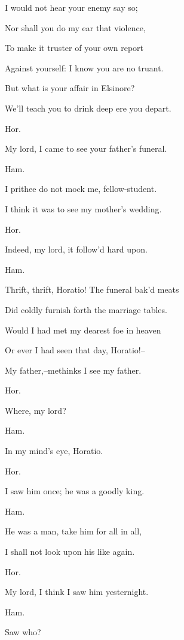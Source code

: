 \documentclass[12pt]{book}
\begin{document}
I would not hear your enemy say so;

Nor shall you do my ear that violence,

To make it truster of your own report

Against yourself: I know you are no truant.

But what is your affair in Elsinore?

We'll teach you to drink deep ere you depart.



Hor.

My lord, I came to see your father's funeral.



Ham.

I prithee do not mock me, fellow-student.

I think it was to see my mother's wedding.



Hor.

Indeed, my lord, it follow'd hard upon.



Ham.

Thrift, thrift, Horatio! The funeral bak'd meats

Did coldly furnish forth the marriage tables.

Would I had met my dearest foe in heaven

Or ever I had seen that day, Horatio!--

My father,--methinks I see my father.



Hor.

Where, my lord?



Ham.

In my mind's eye, Horatio.



Hor.

I saw him once; he was a goodly king.



Ham.

He was a man, take him for all in all,

I shall not look upon his like again.



Hor.

My lord, I think I saw him yesternight.



Ham.

Saw who?
\end{document}
